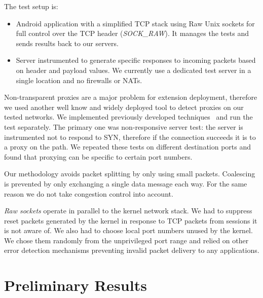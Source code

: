 \documentclass{sig-alternate-10pt}
\begin{document}
The test setup is:
\begin{itemize}
    \item Android application with a simplified TCP stack using Raw Unix sockets for full control over the TCP header (\emph{SOCK\_RAW}). It manages the tests and sends results back to our servers. 
    \item Server instrumented to generate specific responses to incoming packets based on header and payload values. We currently use a dedicated test server in a single location and no firewalls or NATs.
\end{itemize}

Non-transparent proxies are a major problem for extension deployment, therefore we used another well know and widely deployed tool to detect proxies on our tested networks. We implemented previously developed techniques~\cite{Weaver:RHwbx82O} and run the test separately. The primary one was non-responsive server test: the server is instrumented not to respond to SYN, therefore if the connection succeeds it is to a proxy on the path. We repeated these tests on different destination ports and found that proxying can be specific to certain port numbers.

Our methodology avoids packet splitting by only using small packets. Coalescing is prevented by only exchanging a single data message each way. For the same reason we do not take congestion control into account.

\emph{Raw sockets} operate in parallel to the kernel network stack. We had to suppress reset packets generated by the kernel in response to TCP packets from sessions it is not aware of. We also had to choose local port numbers unused by the kernel. We chose them randomly from the unprivileged port range and relied on other error detection mechanisms preventing invalid packet delivery to any applications.

\section{Preliminary Results}
\label{sec:network}
\end{document}
